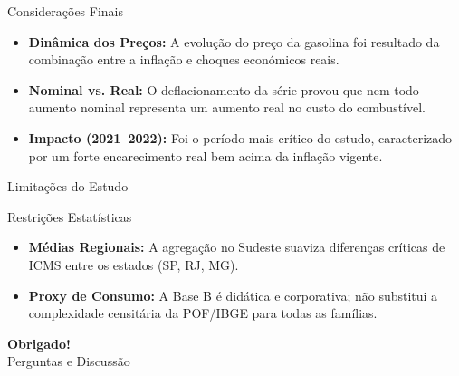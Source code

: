 \documentclass{beamer}
\begin{document}
\begin{frame}{Considerações Finais}
\begin{itemize}
    \item \textbf{Dinâmica dos Preços:} A evolução do preço da gasolina foi resultado da combinação entre a inflação e choques económicos reais.
    
    \vspace{0.3cm}
    
    \item \textbf{Nominal vs. Real:} O deflacionamento da série provou que nem todo aumento nominal representa um aumento real no custo do combustível.
    
    \vspace{0.3cm}
    
    \item \textbf{Impacto (2021--2022):} Foi o período mais crítico do estudo, caracterizado por um forte encarecimento real bem acima da inflação vigente.
\end{itemize}
\end{frame}


\begin{frame}{Limitações do Estudo}
\begin{alertblock}{Restrições Estatísticas}
\begin{itemize}
    \item \textbf{Médias Regionais:} A agregação no Sudeste suaviza diferenças críticas de ICMS entre os estados (SP, RJ, MG).
    \vspace{0.3cm}
    \item \textbf{Proxy de Consumo:} A Base B é didática e corporativa; não substitui a complexidade censitária da POF/IBGE para todas as famílias.
\end{itemize}
\end{alertblock}
\end{frame}


\begin{frame}
\centering
\LARGE \textbf{Obrigado!} \\
\vspace{0.5cm}
\large Perguntas e Discussão \\
\vspace{1cm}
\scriptsize {}
\end{frame}
\end{document}
